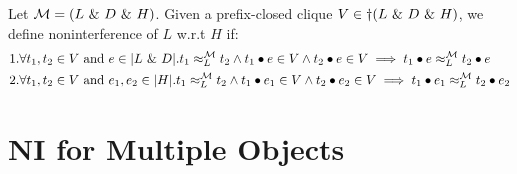 \documentclass[acmsmall,screen,review, nonacm]{acmart}
\begin{document}
\medskip
    {
      \color{blue}
\begin{definition}\label{def:relaxninew}
   Let $\classpart = (L \directprod D \directprod H)$. Given a prefix-closed clique $V \in \dagger(L \directprod D \directprod H)$, we define noninterference of $L$ w.r.t $H$ if:
   \begin{align*}
     & 1. \forall t_1, t_2 \in V \text{ and }  e \in \abs{L \directprod D}. \treq{t_1}{t_2}{L}{\classpart}  \wedge t_1 \tracecat e \in V \wedge t_2 \tracecat  e \in V \implies \treq{t_1  \tracecat  e}{t_2 \tracecat  e}{L}{\classpart} \\
     & 2. \forall t_1, t_2 \in V \text{ and }  e_1, e_2 \in \abs{H}. \treq{t_1}{t_2}{L}{\classpart}  \wedge t_1 \tracecat e_1 \in V \wedge t_2 \tracecat  e_2 \in V \implies \treq{t_1  \tracecat  e_1}{t_2 \tracecat  e_2}{L}{\classpart}
   \end{align*}
\end{definition}
}

    
\clearpage
\section{NI for Multiple Objects}

\begin{definition}\label{def:ni2}

  \mytodo{\dots}
  
\end{definition}





\end{document}
